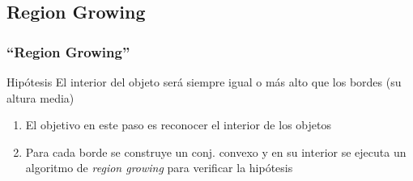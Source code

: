\subsection{Region Growing}
\begin{frame}
  \frametitle{``Region Growing''}
\begin{beamerboxesrounded}[shadow=true]{Hipótesis}
El interior del objeto será siempre igual o más alto que los bordes (su altura media)
\end{beamerboxesrounded}

\begin{enumerate}
 \item El objetivo en este paso es reconocer el \alert{interior} de los objetos
 \item Para cada borde se construye un \alert{conj. convexo} y en su interior se ejecuta un algoritmo de \alert{\emph{region growing}} para verificar la hipótesis
\end{enumerate}
\end{frame}
%
